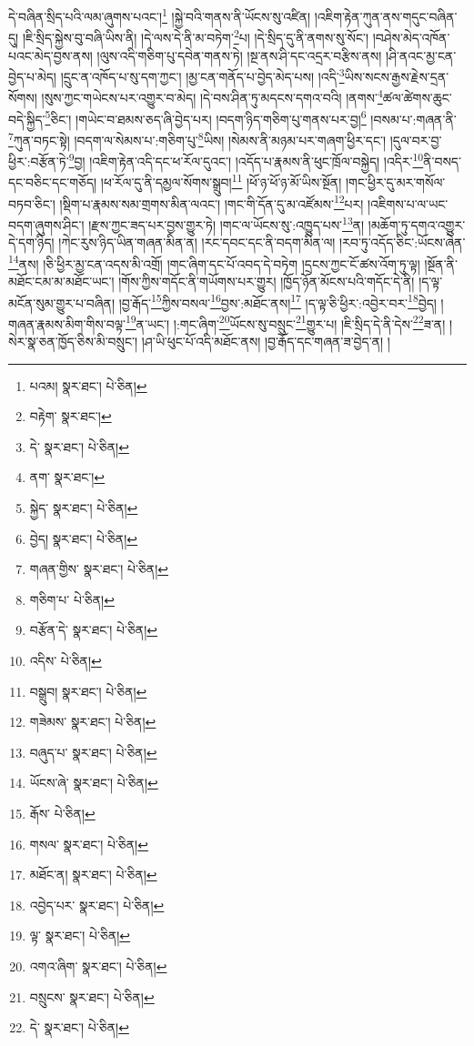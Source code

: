 དེ་བཞིན་སྲིད་པའི་ལམ་ཞུགས་པའང་།\footnote{པའམ།  སྣར་ཐང་།  པེ་ཅིན། } །སྐྱེ་བའི་གནས་ནི་ཡོངས་སུ་འཛིན། །འཇིག་རྟེན་ཀུན་ནས་གདུང་བཞིན་དུ། །ཇི་སྲིད་སྐྱེས་བུ་བཞི་ཡིས་ནི། །དེ་ལས་དེ་ནི་མ་བཏེག་\footnote{བརྟེག་  སྣར་ཐང་། }པ། །དེ་སྲིད་དུ་ནི་ནགས་སུ་སོང་། །བཤེས་མེད་འཁོན་པའང་མེད་བྱས་ནས། །ལུས་འདི་གཅིག་པུ་དབེན་གནས་ཏེ། །སྔ་ནས་ཤི་དང་འདྲར་བརྩིས་ནས། །ཤི་ནའང་མྱ་ངན་བྱེད་པ་མེད། །དྲུང་ན་འཁོད་པ་སུ་དག་ཀྱང་། །མྱ་ངན་གནོད་པ་བྱེད་མེད་པས། །འདི་\footnote{དེ་  སྣར་ཐང་།  པེ་ཅིན། }ཡིས་སངས་རྒྱས་རྗེས་དྲན་སོགས། །སུས་ཀྱང་གཡེངས་པར་འགྱུར་བ་མེད། །དེ་བས་ཤིན་ཏུ་མདངས་དགའ་བའི། །ནགས་\footnote{ནག་  སྣར་ཐང་། }ཚལ་ཚེགས་ཆུང་བདེ་སྐྱིད་\footnote{སྐྱེད་  སྣར་ཐང་།  པེ་ཅིན། }ཅིང་། །གཡེང་བ་ཐམས་ཅད་ཞི་བྱེད་པར། །བདག་ཉིད་གཅིག་པུ་གནས་པར་བྱ།\footnote{བྱེད།  སྣར་ཐང་།  པེ་ཅིན། } །བསམ་པ་:གཞན་ནི་\footnote{གཞན་གྱིས་  སྣར་ཐང་།  པེ་ཅིན། }ཀུན་བཏང་སྟེ། །བདག་ལ་སེམས་པ་:གཅིག་པུ་\footnote{གཅིག་པ་  པེ་ཅིན། }ཡིས། །སེམས་ནི་མཉམ་པར་གཞག་ཕྱིར་དང་། །དུལ་བར་བྱ་ཕྱིར་:བརྩོན་ཏེ་\footnote{བརྩོན་དེ་  སྣར་ཐང་།  པེ་ཅིན། }བྱ། །འཇིག་རྟེན་འདི་དང་ཕ་རོལ་དུའང་། །འདོད་པ་རྣམས་ནི་ཕུང་ཁྲོལ་བསྐྱེད། །འདིར་\footnote{འདིས་  པེ་ཅིན། }ནི་བསད་དང་བཅིང་དང་གཅོད། །ཕ་རོལ་དུ་ནི་དམྱལ་སོགས་སྒྲུབ།\footnote{བསྒྲུབ།  སྣར་ཐང་།  པེ་ཅིན། } །ཕོ་ཉ་ཕོ་ཉ་མོ་ཡིས་སྔོན། །གང་ཕྱིར་དུ་མར་གསོལ་བཏབ་ཅིང་། །སྡིག་པ་རྣམས་སམ་གྲགས་མིན་ལའང་། །གང་གི་དོན་དུ་མ་འཛོམས་\footnote{གཟེམས་  སྣར་ཐང་།  པེ་ཅིན། }པར། །འཇིགས་པ་ལ་ཡང་བདག་ཞུགས་ཤིང་། །རྫས་ཀྱང་ཟད་པར་བྱས་གྱུར་ཏེ། །གང་ལ་ཡོངས་སུ་:འཁྱུད་པས་\footnote{བཞུད་པ་  སྣར་ཐང་།  པེ་ཅིན། }ན། །མཆོག་ཏུ་དགའ་འགྱུར་དེ་དག་ཉིད། །ཀེང་རུས་ཉིད་ཡིན་གཞན་མིན་ན། །རང་དབང་དང་ནི་བདག་མིན་ལ། །རབ་ཏུ་འདོད་ཅིང་:ཡོངས་ཞེན་\footnote{ཡོངས་ཞེ་  སྣར་ཐང་།  པེ་ཅིན། }ནས། །ཅི་ཕྱིར་མྱ་ངན་འདས་མི་འགྲོ། །གང་ཞིག་དང་པོ་འབད་དེ་བཏེག །དྲངས་ཀྱང་ངོ་ཚས་འོག་ཏུ་ལྟ། །སྔོན་ནི་མཐོང་ངམ་མ་མཐོང་ཡང་། །གོས་ཀྱིས་གདོང་ནི་གཡོགས་པར་གྱུར། །ཁྱོད་ཉོན་མོངས་པའི་གདོང་དེ་ནི། །ད་ལྟ་མངོན་སུམ་གྱུར་པ་བཞིན། །བྱ་རྒོད་\footnote{རྒོས་  པེ་ཅིན། }ཀྱིས་བསལ་\footnote{གསལ་  སྣར་ཐང་།  པེ་ཅིན། }བྱས་:མཐོང་ནས།\footnote{མཐོང་ན།  སྣར་ཐང་།  པེ་ཅིན། } །ད་ལྟ་ཅི་ཕྱིར་:འབྱེར་བར་\footnote{འབྱེད་པར་  སྣར་ཐང་།  པེ་ཅིན། }བྱེད། །གཞན་རྣམས་མིག་གིས་བལྟ་\footnote{ལྟ་  སྣར་ཐང་།  པེ་ཅིན། }ན་ཡང་། །:གང་ཞིག་\footnote{འགའ་ཞིག་  སྣར་ཐང་།  པེ་ཅིན། }ཡོངས་སུ་བསྲུང་\footnote{བསྲུངས་  སྣར་ཐང་།  པེ་ཅིན། }གྱུར་པ། །ཇི་སྲིད་དེ་ནི་དེས་\footnote{དེ་  སྣར་ཐང་།  པེ་ཅིན། }ཟ་ན། །སེར་སྣ་ཅན་ཁྱོད་ཅིས་མི་བསྲུང་། །ཤ་ཡི་ཕུང་པོ་འདི་མཐོང་ནས། །བྱ་རྒོད་དང་གཞན་ཟ་བྱེད་ན། །
